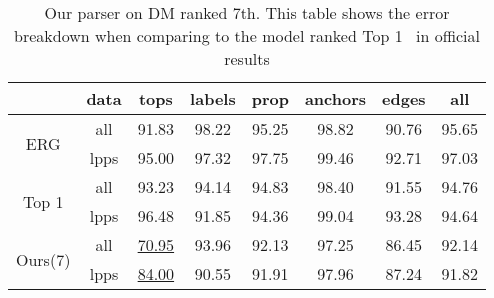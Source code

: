 \begin{table}[!tbp]
\caption{\label{tbl:results_dm} Our parser on DM ranked 7th. This table shows the error breakdown when comparing to the model ranked Top 1~\citep{Li:Zha:Zha:19} in official results}
\begin{center}
\setlength{\tabcolsep}{3pt}
\begin{tabular}{cccccccc}
  \toprule
                            & data & tops              & labels & prop  & anchors & edges & all   \\ \hline
  \multirow{2}{*}{ ERG }    & all  & 91.83             & 98.22  & 95.25 & 98.82   & 90.76 & 95.65 \\
                            & lpps & 95.00             & 97.32  & 97.75 & 99.46   & 92.71 & 97.03 \\
  \multirow{2}{*}{Top 1}    & all  & 93.23             & 94.14  & 94.83 & 98.40   & 91.55 & 94.76 \\
                            & lpps & 96.48             & 91.85  & 94.36 & 99.04   & 93.28 & 94.64 \\
  \multirow{2}{*}{ Ours(7)} & all  & \underline{70.95} & 93.96  & 92.13 & 97.25   & 86.45 & 92.14 \\
                            & lpps & \underline{84.00} & 90.55  & 91.91 & 97.96   & 87.24 & 91.82 \\ \bottomrule
\end{tabular}
\end{center}
\end{table}



